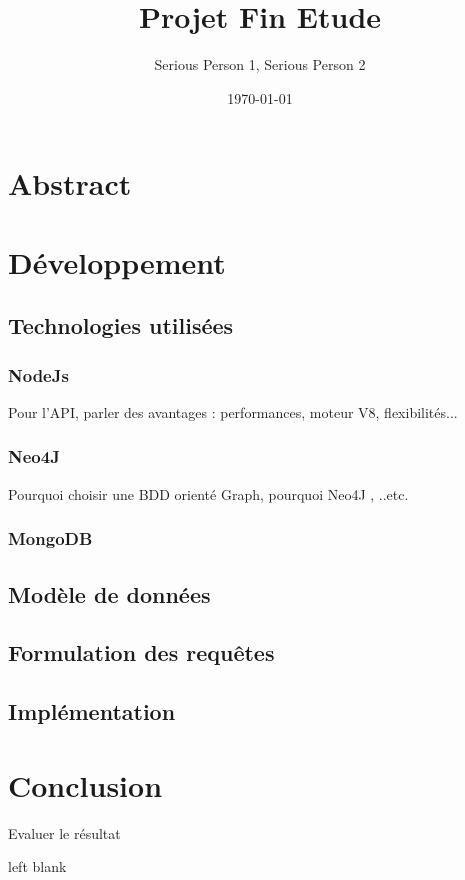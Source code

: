 \documentclass[a4paper, 12pt]{report}
\title{Projet Fin Etude}
\author{Serious Person 1, Serious Person 2}
\date{\today}
\begin{document}
	
	\maketitle

	\pagestyle{fancy}	

	\chapter*{Abstract} 

	\pagestyle{plain}	

	\tableofcontents
	
	
	
	
	
	\chapter{Développement}
		\section{Technologies utilisées}
		\subsection{NodeJs}
			Pour l'API, parler des avantages : performances, moteur V8, flexibilités...  
		\subsection{Neo4J}
			Pourquoi choisir une BDD orienté Graph, pourquoi Neo4J , ..etc.
		\subsection{MongoDB}
		
	\section{Modèle de données}
	\section{Formulation des requêtes}
	\section{Implémentation}
	\chapter{Conclusion}
		Evaluer le résultat 

	\newpage
	left blank
	\newpage
	\listoffigures
	\printbibliography
\end{document}
